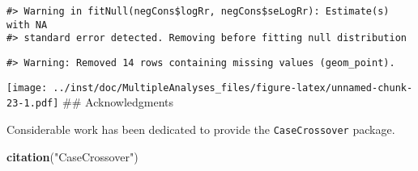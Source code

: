 \documentclass[]{article}
\newenvironment{Shaded}{\begin{snugshade}}{\end{snugshade}}
\newcommand{\CommentTok}[1]{\textcolor[rgb]{0.56,0.35,0.01}{\textit{#1}}}
\newcommand{\DataTypeTok}[1]{\textcolor[rgb]{0.13,0.29,0.53}{#1}}
\newcommand{\DecValTok}[1]{\textcolor[rgb]{0.00,0.00,0.81}{#1}}
\newcommand{\KeywordTok}[1]{\textcolor[rgb]{0.13,0.29,0.53}{\textbf{#1}}}
\newcommand{\NormalTok}[1]{#1}
\newcommand{\OperatorTok}[1]{\textcolor[rgb]{0.81,0.36,0.00}{\textbf{#1}}}
\newcommand{\StringTok}[1]{\textcolor[rgb]{0.31,0.60,0.02}{#1}}
\begin{document}
\begin{Shaded}
\end{Shaded}

\begin{verbatim}
#> Warning in fitNull(negCons$logRr, negCons$seLogRr): Estimate(s) with NA
#> standard error detected. Removing before fitting null distribution
\end{verbatim}

\begin{verbatim}
#> Warning: Removed 14 rows containing missing values (geom_point).
\end{verbatim}

\texttt{[image: ../inst/doc/MultipleAnalyses\_files/figure-latex/unnamed-chunk-23-1.pdf]}
\#\# Acknowledgments

Considerable work has been dedicated to provide the
\texttt{CaseCrossover} package.

\begin{Shaded}
\begin{Highlighting}[]
\KeywordTok{citation}\NormalTok{(}\StringTok{"CaseCrossover"}\NormalTok{)}
\end{Highlighting}
\end{Shaded}
\end{document}
